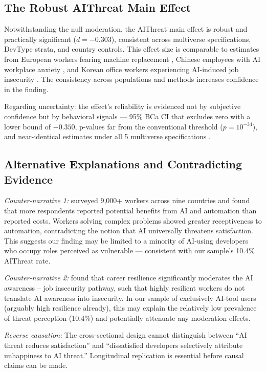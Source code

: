 \documentclass[11pt]{article}
\begin{document}
\subsection{The Robust AIThreat Main Effect}
Notwithstanding the null moderation, the AIThreat main effect is robust and practically
significant ($d = -0.303$), consistent across multiverse specifications, DevType
strata, and country controls. This effect size is comparable to estimates from
European workers fearing machine replacement \citep{schwabe2020automation}, Chinese
employees with AI workplace anxiety \citep{zhao2025impact}, and Korean office workers
experiencing AI-induced job insecurity \citep{chung2025ai}. The consistency across
populations and methods increases confidence in the finding.

Regarding uncertainty: the effect's reliability is evidenced not by subjective
confidence but by behavioral signals --- 95\% BCa CI that excludes zero with a
lower bound of $-0.350$, p-values far from the conventional threshold
($p = 10^{-34}$), and near-identical estimates under all 5 multiverse specifications
\citep{simonsohn2020multiverse}.

\subsection{Alternative Explanations and Contradicting Evidence}

\textit{Counter-narrative 1:} \citet{armstrong2024automation} surveyed 9,000+
workers across nine countries and found that more respondents reported potential
benefits from AI and automation than reported costs. Workers solving complex problems
showed greater receptiveness to automation, contradicting the notion that AI
universally threatens satisfaction. This suggests our finding may be limited to
a minority of AI-using developers who occupy roles perceived as vulnerable ---
consistent with our sample's 10.4\% AIThreat rate.

\textit{Counter-narrative 2:} \citet{chung2025ai} found that career resilience
significantly moderates the AI awareness -- job insecurity pathway, such that highly
resilient workers do not translate AI awareness into insecurity. In our sample of
exclusively AI-tool users (arguably high resilience already), this may explain the
relatively low prevalence of threat perception (10.4\%) and potentially attenuate
any moderation effects.

\textit{Reverse causation:} The cross-sectional design cannot distinguish between
``AI threat reduces satisfaction'' and ``dissatisfied developers selectively
attribute unhappiness to AI threat.'' Longitudinal replication is essential before
causal claims can be made.
\end{document}
